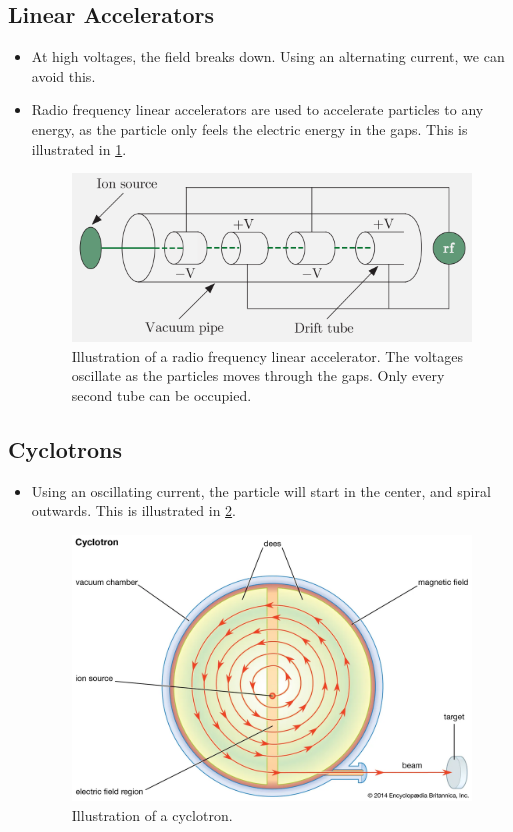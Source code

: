 \subsection{Linear Accelerators}
\begin{itemize}
    \item At high voltages, the field breaks down. Using an alternating current, we can avoid this.
    \item Radio frequency linear accelerators are used to accelerate particles to any energy, as the particle only feels the electric energy in the gaps. This is illustrated in \cref{fig: rad-freq_lin_acc}.
    \begin{figure}[h!]
    \centering
    \includegraphics[width = .7\textwidth]{rad-freq_lin_acc.png}
    \caption{Illustration of a radio frequency linear accelerator. The voltages oscillate as the particles moves through the gaps. Only every second tube can be occupied. }
    \label{fig: rad-freq_lin_acc}
    \end{figure}
\end{itemize}

\subsection{Cyclotrons}
\begin{itemize}
    \item Using an oscillating current, the particle will start in the center, and spiral outwards. This is illustrated in \cref{fig: cyclotron}.
    \begin{figure}[h!]
    \centering
    \includegraphics[width = .6\textwidth]{cyclotron.png}
    \caption{Illustration of a cyclotron. }
    \label{fig: cyclotron}
    \end{figure}
\end{itemize}

